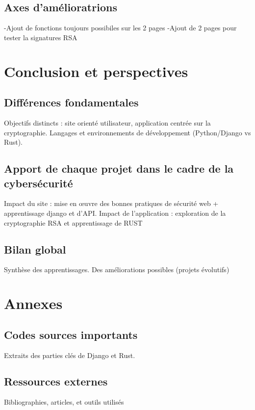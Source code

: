 \documentclass[12pt]{article} %
\begin{document}
	\subsection{Axes d’amélioratrions }
		-Ajout de fonctions toujours possibiles sur les 2 pages
		-Ajout de 2 pages pour tester la signatures RSA 



\section{Conclusion et perspectives}
	\subsection{Différences fondamentales}
		Objectifs distincts : site orienté utilisateur, application centrée sur la cryptographie.
Langages et environnements de développement (Python/Django vs Rust).


	\subsection{Apport de chaque projet dans le cadre de la cybersécurité}
		Impact du site : mise en œuvre des bonnes pratiques de sécurité web + apprentissage django et d’API.
Impact de l’application : exploration de la cryptographie RSA et apprentissage de RUST
	
	
	
	\subsection{Bilan global}
		Synthèse des apprentissages.
Des améliorations possibles (projets évolutifs)



\section*{Annexes}
	\subsection{Codes sources importants}
		Extraits des parties clés de Django et Rust.
	\subsection{Ressources externes}
		Bibliographies, articles, et outils utilisés
\end{document}
